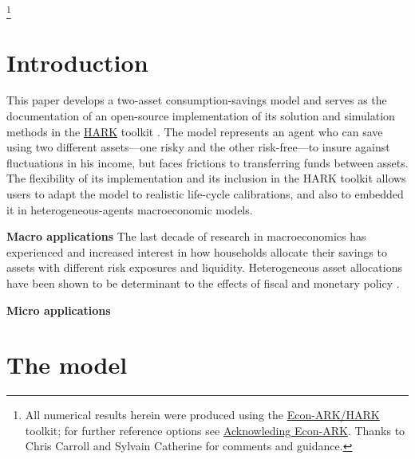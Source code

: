 \documentclass[./RiskyContrib.tex]{subfiles}
\begin{document}
\begin{authorsinfo}
\end{authorsinfo}

\thanks{All numerical results herein were produced using the \href{https://econ-ark/HARK}{Econ-ARK/HARK} toolkit; for further reference options see \href{https://econ-ark.org/acknowledging/}{Acknowleding Econ-ARK}.  Thanks to Chris Carroll and Sylvain Catherine for comments and guidance.}

\titlepagefinish

\newtheorem{defn}{Definition}
\newtheorem{theorem}{Theorem}

\hypertarget{Introduction}{}
\section{Introduction}

This paper develops a two-asset consumption-savings model and serves as
the documentation of an open-source implementation of its
solution and simulation methods in the \href{https://econ-ark.org/toolkit}{HARK}
toolkit \citep{carroll2018HARK}. The model represents an agent who can
save using two different assets---one risky and the other risk-free---to insure
against fluctuations in his income, but faces frictions to transferring funds between
assets. The flexibility of its implementation and its inclusion in the HARK
toolkit allows users to adapt the model to realistic life-cycle calibrations, and
also to embedded it in heterogeneous-agents macroeconomic models.

\textbf{Macro applications}
The last decade of research in macroeconomics has experienced and increased
interest in how households allocate their savings to assets with different
risk exposures and liquidity. Heterogeneous asset allocations have been shown
to be determinant to the effects of fiscal and monetary policy
\citep{Kaplan2014ecta,Luetticke2021aej_macro}.

\textbf{Micro applications}

\hypertarget{The model}{}
\section{The model}
\end{document}
